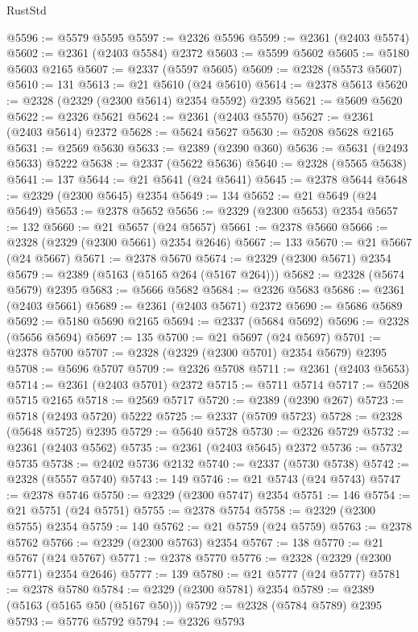 \begin{lexlean}{RustStd}
\begin{coremodule}
@5596 := @5579 @5595
@5597 := @2326 @5596
@5599 := @2361 (@2403 @5574)
@5602 := @2361 (@2403 @5584) @2372
@5603 := @5599 @5602
@5605 := @5180 @5603 @2165
@5607 := @2337 (@5597 @5605)
@5609 := @2328 (@5573 @5607)
@5610 := 131
@5613 := @21 @5610 (@24 @5610)
@5614 := @2378 @5613
@5620 := @2328 (@2329 (@2300 @5614) @2354 @5592) @2395
@5621 := @5609 @5620
@5622 := @2326 @5621
@5624 := @2361 (@2403 @5570)
@5627 := @2361 (@2403 @5614) @2372
@5628 := @5624 @5627
@5630 := @5208 @5628 @2165
@5631 := @2569 @5630
@5633 := @2389 (@2390 @360)
@5636 := @5631 (@2493 @5633) @5222
@5638 := @2337 (@5622 @5636)
@5640 := @2328 (@5565 @5638)
@5641 := 137
@5644 := @21 @5641 (@24 @5641)
@5645 := @2378 @5644
@5648 := @2329 (@2300 @5645) @2354
@5649 := 134
@5652 := @21 @5649 (@24 @5649)
@5653 := @2378 @5652
@5656 := @2329 (@2300 @5653) @2354
@5657 := 132
@5660 := @21 @5657 (@24 @5657)
@5661 := @2378 @5660
@5666 := @2328 (@2329 (@2300 @5661) @2354 @2646)
@5667 := 133
@5670 := @21 @5667 (@24 @5667)
@5671 := @2378 @5670
@5674 := @2329 (@2300 @5671) @2354
@5679 := @2389 (@5163 (@5165 @264 (@5167 @264)))
@5682 := @2328 (@5674 @5679) @2395
@5683 := @5666 @5682
@5684 := @2326 @5683
@5686 := @2361 (@2403 @5661)
@5689 := @2361 (@2403 @5671) @2372
@5690 := @5686 @5689
@5692 := @5180 @5690 @2165
@5694 := @2337 (@5684 @5692)
@5696 := @2328 (@5656 @5694)
@5697 := 135
@5700 := @21 @5697 (@24 @5697)
@5701 := @2378 @5700
@5707 := @2328 (@2329 (@2300 @5701) @2354 @5679) @2395
@5708 := @5696 @5707
@5709 := @2326 @5708
@5711 := @2361 (@2403 @5653)
@5714 := @2361 (@2403 @5701) @2372
@5715 := @5711 @5714
@5717 := @5208 @5715 @2165
@5718 := @2569 @5717
@5720 := @2389 (@2390 @267)
@5723 := @5718 (@2493 @5720) @5222
@5725 := @2337 (@5709 @5723)
@5728 := @2328 (@5648 @5725) @2395
@5729 := @5640 @5728
@5730 := @2326 @5729
@5732 := @2361 (@2403 @5562)
@5735 := @2361 (@2403 @5645) @2372
@5736 := @5732 @5735
@5738 := @2402 @5736 @2132
@5740 := @2337 (@5730 @5738)
@5742 := @2328 (@5557 @5740)
@5743 := 149
@5746 := @21 @5743 (@24 @5743)
@5747 := @2378 @5746
@5750 := @2329 (@2300 @5747) @2354
@5751 := 146
@5754 := @21 @5751 (@24 @5751)
@5755 := @2378 @5754
@5758 := @2329 (@2300 @5755) @2354
@5759 := 140
@5762 := @21 @5759 (@24 @5759)
@5763 := @2378 @5762
@5766 := @2329 (@2300 @5763) @2354
@5767 := 138
@5770 := @21 @5767 (@24 @5767)
@5771 := @2378 @5770
@5776 := @2328 (@2329 (@2300 @5771) @2354 @2646)
@5777 := 139
@5780 := @21 @5777 (@24 @5777)
@5781 := @2378 @5780
@5784 := @2329 (@2300 @5781) @2354
@5789 := @2389 (@5163 (@5165 @50 (@5167 @50)))
@5792 := @2328 (@5784 @5789) @2395
@5793 := @5776 @5792
@5794 := @2326 @5793

\end{coremodule}
\end{lexlean}
